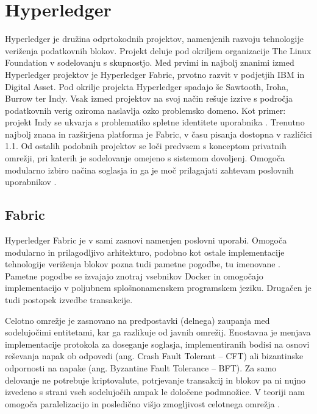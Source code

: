 \documentclass[a4paper, 12pt]{book}
\begin{document}
\section{Hyperledger}
Hyperledger je družina odprtokodnih projektov, namenjenih razvoju tehnologije veriženja podatkovnih blokov.
Projekt deluje pod okriljem organizacije The Linux Foundation v sodelovanju s skupnostjo.
Med prvimi in najbolj znanimi izmed Hyperledger projektov je Hyperledger Fabric, prvotno razvit v podjetjih IBM in Digital Asset.
Pod okrilje projekta Hyperledger spadajo še Sawtooth, Iroha, Burrow ter Indy.
Vsak izmed projektov na svoj način rešuje izzive s področja podatkovnih verig oziroma naslavlja ozko problemsko domeno. Kot primer: projekt Indy se ukvarja s problematiko spletne identitete uporabnika \cite{hyperledgerWeb}.
Trenutno najbolj znana in razširjena platforma je Fabric, v času pisanja dostopna v različici 1.1.
Od ostalih podobnih projektov se loči predvsem s konceptom privatnih omrežji, pri katerih je sodelovanje omejeno s sistemom dovoljenj.
Omogoča modularno izbiro načina soglasja in ga je moč prilagajati zahtevam poslovnih uporabnikov \cite{hyperledgerIbm}.

\subsection{Fabric}
Hyperledger Fabric je v sami zasnovi namenjen poslovni uporabi.
Omogoča modularno in prilagodljivo arhitekturo, podobno kot ostale implementacije tehnologije veriženja blokov pozna tudi pametne pogodbe, tu imenovane .
Pametne pogodbe se izvajajo znotraj vsebnikov Docker in omogočajo implementacijo v poljubnem splošnonamenskem programskem jeziku.
Drugačen je tudi postopek izvedbe transakcije.

Celotno omrežje je zasnovano na predpostavki (delnega) zaupanja med sodelujočimi entitetami, kar ga razlikuje od javnih omrežij.
Enostavna je menjava implementacije protokola za doseganje soglasja, implementiranih bodisi na osnovi reševanja napak ob odpovedi (ang. Crash Fault Tolerant -- CFT) ali bizantinske odpornosti na napake (ang. Byzantine Fault Tolerance -- BFT).
Za samo delovanje ne potrebuje kriptovalute, potrjevanje transakcij in blokov pa ni nujno izvedeno s strani vseh sodelujočih ampak le določene podmnožice.
V teoriji nam omogoča paralelizacijo in posledično višjo zmogljivost celotnega omrežja \cite{hyperledgerDocs}.
\end{document}
